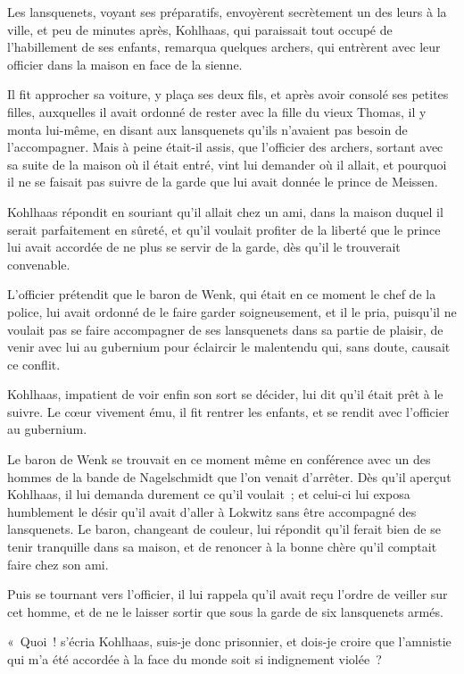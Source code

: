 \documentclass[french,twoside]{book} %
\begin{document}
Les lansquenets, voyant ses préparatifs, envoyèrent secrètement un des leurs à la ville, et peu de minutes après, Kohlhaas, qui paraissait tout occupé de l’habillement de ses enfants, remarqua quelques archers, qui entrèrent avec leur officier dans la maison en face de la sienne.\par
Il fit approcher sa voiture, y plaça ses deux fils, et après avoir consolé ses petites filles, auxquelles il avait ordonné de rester avec la fille du vieux Thomas, il y monta lui-même, en disant aux lansquenets qu’ils n’avaient pas besoin de l’accompagner. Mais à peine était-il assis, que l’officier des archers, sortant avec sa suite de la maison où il était entré, vint lui demander où il allait, et pourquoi il ne se faisait pas suivre de la garde que lui avait donnée le prince de Meissen.\par
Kohlhaas répondit en souriant qu’il allait chez un ami, dans la maison duquel il serait parfaitement en sûreté, et qu’il voulait profiter de la liberté que le prince lui avait accordée de ne plus se servir de la garde, dès qu’il le trouverait convenable.\par
L’officier prétendit que le baron de Wenk, qui était en ce moment le chef de la police, lui avait ordonné de le faire garder soigneusement, et il le pria, puisqu’il ne voulait pas se faire accompagner de ses lansquenets dans sa partie de plaisir, de venir avec lui au gubernium pour éclaircir le malentendu qui, sans doute, causait ce conflit.\par
Kohlhaas, impatient de voir enfin son sort se décider, lui dit qu’il était prêt à le suivre. Le cœur vivement ému, il fit rentrer les enfants, et se rendit avec l’officier au gubernium.\par
Le baron de Wenk se trouvait en ce moment même en conférence avec un des hommes de la bande de Nagelschmidt que l’on venait d’arrêter. Dès qu’il aperçut Kohlhaas, il lui demanda durement ce qu’il voulait ; et celui-ci lui exposa humblement le désir qu’il avait d’aller à Lokwitz sans être accompagné des lansquenets. Le baron, changeant de couleur, lui répondit qu’il ferait bien de se tenir tranquille dans sa maison, et de renoncer à la bonne chère qu’il comptait faire chez son ami.\par
Puis se tournant vers l’officier, il lui rappela qu’il avait reçu l’ordre de veiller sur cet homme, et de ne le laisser sortir que sous la garde de six lansquenets armés.\par
« Quoi ! s’écria Kohlhaas, suis-je donc prisonnier, et dois-je croire que l’amnistie qui m’a été accordée à la face du monde soit si indignement violée ?\par
\end{document}
